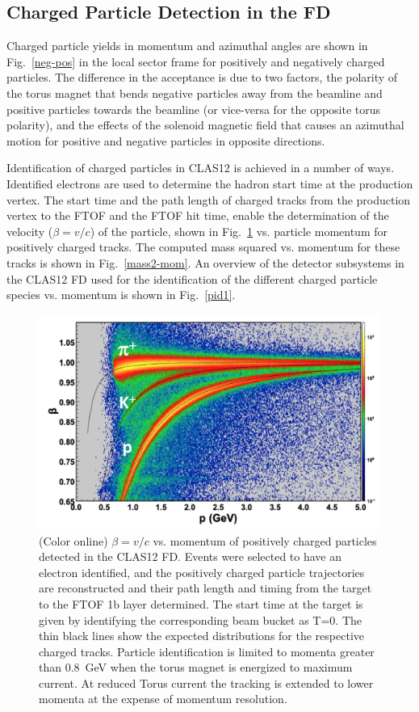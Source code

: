 \documentclass[final,3p,twocolumn]{elsarticle}
\begin{document}
\subsection{Charged Particle Detection in the FD}
 
Charged particle yields in momentum and azimuthal angles are shown in Fig.~\ref{neg-pos} in the local sector
frame for positively and negatively charged particles. The difference in the acceptance is due to two factors, the
polarity of the torus magnet that bends negative particles away from the beamline and positive particles towards
the beamline (or vice-versa for the opposite torus polarity), and the effects of the solenoid magnetic field that
causes an azimuthal motion for positive and negative particles in opposite directions. 


Identification of charged particles in CLAS12 is achieved in a number of ways. Identified electrons are used
to determine the hadron start time at the production vertex. The start time and the path length of charged
tracks from the production vertex to the FTOF and the FTOF hit time, enable the determination of the
velocity ($\beta = v/c$) of the particle, shown in Fig.~\ref{pid} vs. particle momentum for positively charged
tracks. The computed mass squared vs. momentum for these tracks is shown in Fig.~\ref{mass2-mom}. An
overview of the detector subsystems in the CLAS12 FD used for the identification of the different charged
particle species vs. momentum is shown in Fig.~\ref{pid1}. 

\begin{figure}[ht!]
\centerline{\includegraphics[width=1.0\columnwidth]{FTOF1b_pid.png}}
\caption{(Color online) $\beta = v/c $ vs. momentum of positively charged particles detected in the CLAS12 FD.
Events were selected to have an electron identified, and the positively charged particle trajectories are reconstructed 
and their path length and timing from the target to the FTOF 1b layer determined. The start time at the 
target is given by identifying the corresponding beam bucket as T=0.     
  The thin black lines show the expected distributions for the respective charged tracks. Particle identification
  is limited to momenta greater than 0.8~GeV when the torus magnet is energized to maximum current. At
  reduced Torus current the tracking is extended to lower momenta at the expense of momentum resolution.}
\label{pid}
\end{figure} 
\end{document}
